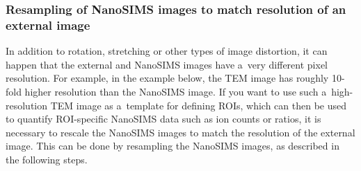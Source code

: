 

\subsubsection{Resampling of NanoSIMS images to match resolution of an external image}
\setcounter{step}{0}

\goldbox{}
In addition to rotation, stretching or other types of image distortion, it can happen that the external and NanoSIMS images have a~very different pixel resolution. For example, in the example below, the TEM image has roughly 10-fold higher resolution than the NanoSIMS image. If you want to use such a~high-resolution TEM image as a~template for defining ROIs, which can then be used to quantify ROI-specific NanoSIMS data such as ion counts or ratios, it is necessary to rescale the NanoSIMS images to match the resolution of the external image. This can be done by resampling the NanoSIMS images, as described in the following steps.
\tcbe


